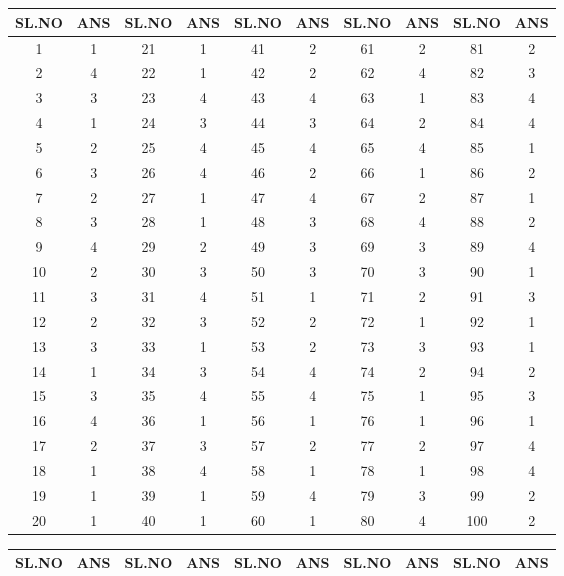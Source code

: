 \clearpage
\section*{}
{\englishfont\small\centering\renewcommand{\arraystretch}{0.95}
\begin{tabular}{|c|c||c|c||c|c||c|c||c|c|}
\hline
SL.NO & ANS & SL.NO & ANS & SL.NO & ANS & SL.NO & ANS & SL.NO & ANS \\
\hline
1 & 1 & 21 & 1 & 41 & 2 & 61 & 2 & 81 & 2 \\
2 & 4 & 22 & 1 & 42 & 2 & 62 & 4 & 82 & 3 \\
3 & 3 & 23 & 4 & 43 & 4 & 63 & 1 & 83 & 4 \\
4 & 1 & 24 & 3 & 44 & 3 & 64 & 2 & 84 & 4 \\
5 & 2 & 25 & 4 & 45 & 4 & 65 & 4 & 85 & 1 \\
6 & 3 & 26 & 4 & 46 & 2 & 66 & 1 & 86 & 2 \\
7 & 2 & 27 & 1 & 47 & 4 & 67 & 2 & 87 & 1 \\
8 & 3 & 28 & 1 & 48 & 3 & 68 & 4 & 88 & 2 \\
9 & 4 & 29 & 2 & 49 & 3 & 69 & 3 & 89 & 4 \\
10 & 2 & 30 & 3 & 50 & 3 & 70 & 3 & 90 & 1 \\
11 & 3 & 31 & 4 & 51 & 1 & 71 & 2 & 91 & 3 \\
12 & 2 & 32 & 3 & 52 & 2 & 72 & 1 & 92 & 1 \\
13 & 3 & 33 & 1 & 53 & 2 & 73 & 3 & 93 & 1 \\
14 & 1 & 34 & 3 & 54 & 4 & 74 & 2 & 94 & 2 \\
15 & 3 & 35 & 4 & 55 & 4 & 75 & 1 & 95 & 3 \\
16 & 4 & 36 & 1 & 56 & 1 & 76 & 1 & 96 & 1 \\
17 & 2 & 37 & 3 & 57 & 2 & 77 & 2 & 97 & 4 \\
18 & 1 & 38 & 4 & 58 & 1 & 78 & 1 & 98 & 4 \\
19 & 1 & 39 & 1 & 59 & 4 & 79 & 3 & 99 & 2 \\
20 & 1 & 40 & 1 & 60 & 1 & 80 & 4 & 100 & 2 \\
\hline
\end{tabular}\par\bigskip
\begin{tabular}{|c|c||c|c||c|c||c|c||c|c|}
\hline
SL.NO & ANS & SL.NO & ANS & SL.NO & ANS & SL.NO & ANS & SL.NO & ANS \\
\hline

\end{tabular}}
